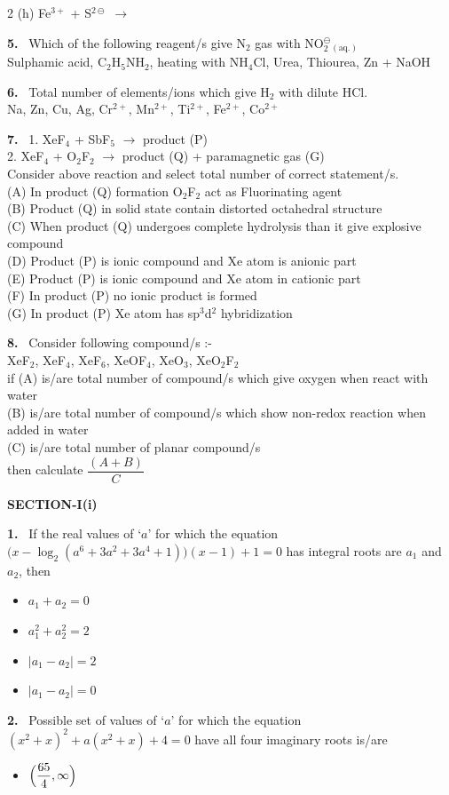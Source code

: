\documentclass[10pt]{extarticle}
\newcommand{\partsec}[2]{\par\medskip\noindent{\large\bfseries PART-#1: #2}\par\smallskip}
\newcommand{\sect}[1]{\par\smallskip\noindent\textbf{#1}\par}
\newcommand{\qn}[1]{\par\smallskip\noindent\textbf{#1.}~}
\newenvironment{qoptions}{\begin{itemize}[leftmargin=1.8em,itemsep=1pt,topsep=2pt,label={}]}{\end{itemize}}
\newcommand{\opt}[2]{\item[(#1)] #2}
\begin{document}
\begin{multicols}{2}
(h) Fe$^{3+}$ + S$^{2\ominus}$ $\to$
\qn{5} Which of the following reagent/s give N$_2$ gas with NO$_2^{\ominus}$$_{\mathrm{(aq.)}}$\\
Sulphamic acid, C$_2$H$_5$NH$_2$, heating with NH$_4$Cl, Urea, Thiourea, Zn + NaOH
\qn{6} Total number of elements/ions which give H$_2$ with dilute HCl.\\
Na, Zn, Cu, Ag, Cr$^{2+}$, Mn$^{2+}$, Ti$^{2+}$, Fe$^{2+}$, Co$^{2+}$
\qn{7} 1. XeF$_4$ + SbF$_5$ $\to$ product (P)\\
2. XeF$_4$ + O$_2$F$_2$ $\to$ product (Q) + paramagnetic gas (G)\\
Consider above reaction and select total number of correct statement/s.\\
(A) In product (Q) formation O$_2$F$_2$ act as Fluorinating agent\\
(B) Product (Q) in solid state contain distorted octahedral structure\\
(C) When product (Q) undergoes complete hydrolysis than it give explosive compound\\
(D) Product (P) is ionic compound and Xe atom is anionic part\\
(E) Product (P) is ionic compound and Xe atom in cationic part\\
(F) In product (P) no ionic product is formed\\
(G) In product (P) Xe atom has sp$^3$d$^2$ hybridization
\qn{8} Consider following compound/s :-\\
XeF$_2$, XeF$_4$, XeF$_6$, XeOF$_4$, XeO$_3$, XeO$_2$F$_2$\\
if (A) is/are total number of compound/s which give oxygen when react with water\\
(B) is/are total number of compound/s which show non-redox reaction when added in water\\
(C) is/are total number of planar compound/s\\
then calculate $\dfrac{(A+B)}C$
\partsec{3}{MATHEMATICS}
\sect{SECTION-I(i)}
\qn{1} If the real values of `$a$' for which the equation $\bigl(x-\log_2(a^6+3a^2+3a^4+1)\bigr)(x-1)+1=0$ has integral roots are $a_1$ and $a_2$, then
\begin{qoptions}
\opt{A}{$a_1+a_2=0$}
\opt{B}{$a_1^2+a_2^2=2$}
\opt{C}{$|a_1-a_2|=2$}
\opt{D}{$|a_1-a_2|=0$}
\end{qoptions}
\qn{2} Possible set of values of `$a$' for which the equation $(x^2+x)^2+a(x^2+x)+4=0$ have all four imaginary roots is/are
\begin{qoptions}
\opt{A}{$\Bigl(\dfrac{65}4,\infty\Bigr)$}

\end{qoptions}$$
\end{multicols}
\end{document}
